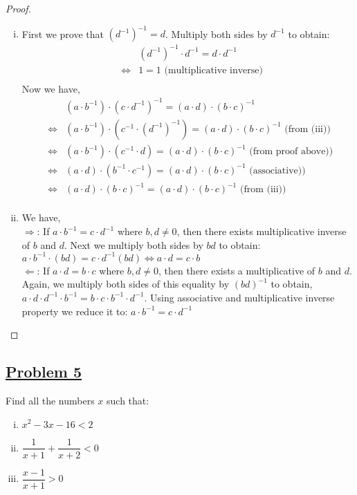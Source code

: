 \documentclass[10pt,letterpaper]{article}
\begin{document}
\begin{proof}
\begin{enumerate}[(i)]
	\item First we prove that $(d^{-1})^{-1} = d$. Multiply both sides by $d^{-1}$ to obtain:
	\begin{eqnarray*}	
	& & (d^{-1})^{-1} \cdot d^{-1} = d \cdot d^{-1} \\
	& \Leftrightarrow & 1 = 1 \text{ (multiplicative inverse)} \\
	\end{eqnarray*}
	Now we have,
	\begin{eqnarray*}
	& & (a \cdot b^{-1}) \cdot (c \cdot d^{-1})^{-1} = (a \cdot d) \cdot (b \cdot c)^{-1} \\
	& \Leftrightarrow & (a \cdot b^{-1}) \cdot (c^{-1} \cdot (d^{-1})^{-1}) = (a \cdot d) \cdot (b \cdot c)^{-1}
	\text{ (from (iii)) }\\
	& \Leftrightarrow & (a \cdot b^{-1}) \cdot (c^{-1} \cdot d) = (a \cdot d) \cdot (b \cdot c)^{-1}
	\text{ (from proof above)) }\\
	& \Leftrightarrow & (a \cdot d) \cdot (b^{-1} \cdot c^{-1}) = (a \cdot d) \cdot (b \cdot c)^{-1}
	\text{ (associative)) }\\
	& \Leftrightarrow & (a \cdot d) \cdot (b \cdot c)^{-1} = (a \cdot d) \cdot (b \cdot c)^{-1}
	\text{ (from (iii)) }\\
	\end{eqnarray*}
	
	\item We have, \\
	$\Rightarrow$: If $a \cdot b^{-1} = c \cdot d^{-1}$ where $b, d \neq 0$, then there exists 
	multiplicative inverse of $b$ and $d$. Next we multiply both sides by $bd$ to obtain:
	$a \cdot b^{-1} \cdot (bd) = c \cdot d^{-1} (bd) \Leftrightarrow
	a \cdot d = c \cdot b$ \\
	$\Leftarrow$: If $a \cdot d = b \cdot c$ where $b, d \neq 0$, then there exists a multiplicative
	of $b$ and $d$. Again, we multiply both sides of this equality by $(bd)^{-1}$ to obtain, 
	$a \cdot d \cdot d^{-1} \cdot b^{-1} = b \cdot c \cdot b^{-1} \cdot d^{-1}$. Using associative and 
	multiplicative inverse property we reduce it to: $a \cdot b^{-1} = c \cdot d^{-1}$	
	\end{enumerate}
\end{proof}
	
	\subsection*{{\color{purple}\underline{Problem 5}}}
	Find all the numbers $x$ such that:
	\begin{enumerate}[(i)]
		\item $x^2 - 3x - 16 < 2$ 
		\item $\dfrac{1}{x + 1} + \dfrac{1}{x + 2} < 0$ 
		\item $\dfrac{x - 1}{x + 1} > 0$
	\end{enumerate}
	
\end{document}
